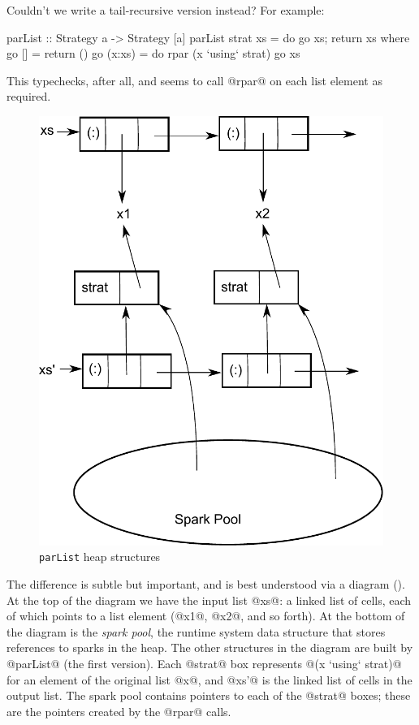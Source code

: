 Couldn't we write a tail-recursive version instead?  For example:

\begin{haskell}
parList :: Strategy a -> Strategy [a]
parList strat xs = do go xs; return xs
  where go [] = return ()
        go (x:xs) = do
           rpar (x `using` strat)
           go xs
\end{haskell}

\noindent This typechecks, after all, and seems to call @rpar@ on each
list element as required.

\begin{figure}
\begin{center}
\includegraphics[scale=0.6]{parlist1.pdf}
\end{center}
\caption{\texttt{parList} heap structures}
\label{fig:parlist-heap}
\end{figure}

The difference is subtle but important, and is best understood via a
diagram ().  At the top of the diagram we have
the input list @xs@: a linked list of cells, each of which points to a
list element (@x1@, @x2@, and so forth).  At the bottom of the diagram
is the \emph{spark pool}, the runtime system data structure that
stores references to sparks in the heap.  The other structures in the
diagram are built by @parList@ (the first version).  Each @strat@ box
represents @(x `using` strat)@ for an element of the original list
@x@, and @xs'@ is the linked list of cells in the output list.  The
spark pool contains pointers to each of the @strat@ boxes; these are
the pointers created by the @rpar@ calls.

